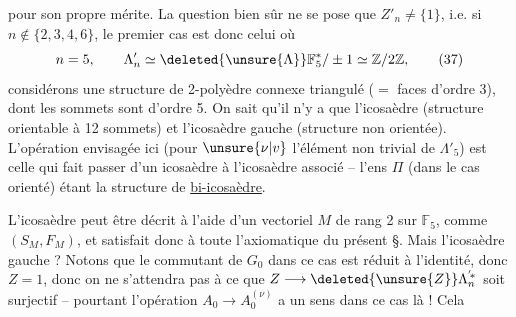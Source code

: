 
pour son propre mérite. La question bien sûr ne se pose que $Z'_n\ne\{1\}$, i.e. si $n\notin\{2,3,4,6\}$, le premier cas est donc celui où
\[
n=5,\qquad \Lambda'_{n}\simeq\deleted{\unsure{\Lambda}}\mathbb F_5^*/\pm1\simeq\mathbb Z/2\mathbb Z,\tag*{(37)}
\]
considérons une structure de 2-polyèdre connexe triangulé ($=$ faces d'ordre 3), dont les sommets sont  d'ordre 5. On sait qu'il n'y a que l'icosaèdre (structure orientable à 12 sommets) et l'icosaèdre gauche (structure non orientée). L'opération envisagée ici (pour $\unsure{\nu|v}$ l'élément non trivial de $\Lambda'_5$) est celle qui fait passer d'un icosaèdre à l'icosaèdre associé -- l'ens $\Pi$ (dans le cas orienté) étant la structure de \uline{bi-icosaèdre}.

L'icosaèdre peut être décrit à l'aide d'un vectoriel $M$ de rang 2 sur $\mathbb F_5$, comme $(S_M,F_M)$, et satisfait donc à toute l'axiomatique du présent §. Mais l'icosaèdre gauche ? Notons que le commutant de $G_0$ dans ce cas est réduit à l'identité, donc $Z=1$, donc on ne s'attendra pas à ce que $Z\longrightarrow\deleted{\unsure{Z}}\Lambda_n^{'\!*}$ soit surjectif -- pourtant l'opération $A_0\longrightarrow A_0^{(\nu)}$ a un sens dans ce cas là ! Cela

